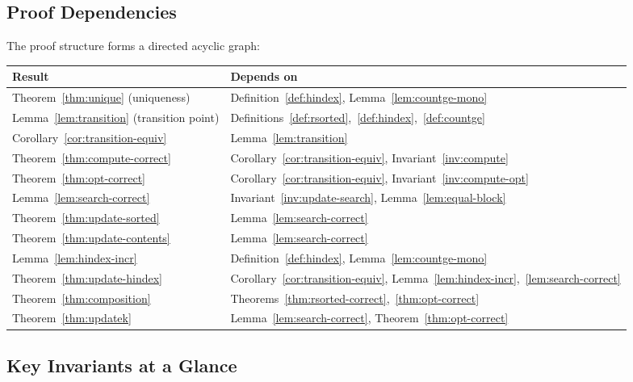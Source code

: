 \subsection{Proof Dependencies}

The proof structure forms a directed acyclic graph:

\begin{center}
\begin{tabular}{@{}ll@{}}
\toprule
\textbf{Result} & \textbf{Depends on} \\
\midrule
Theorem~\ref{thm:unique} (uniqueness) & Definition~\ref{def:hindex}, Lemma~\ref{lem:countge-mono} \\
Lemma~\ref{lem:transition} (transition point) & Definitions~\ref{def:rsorted},~\ref{def:hindex},~\ref{def:countge} \\
Corollary~\ref{cor:transition-equiv} & Lemma~\ref{lem:transition} \\
Theorem~\ref{thm:compute-correct} & Corollary~\ref{cor:transition-equiv}, Invariant~\ref{inv:compute} \\
Theorem~\ref{thm:opt-correct} & Corollary~\ref{cor:transition-equiv}, Invariant~\ref{inv:compute-opt} \\
Lemma~\ref{lem:search-correct} & Invariant~\ref{inv:update-search}, Lemma~\ref{lem:equal-block} \\
Theorem~\ref{thm:update-sorted} & Lemma~\ref{lem:search-correct} \\
Theorem~\ref{thm:update-contents} & Lemma~\ref{lem:search-correct} \\
Lemma~\ref{lem:hindex-incr} & Definition~\ref{def:hindex}, Lemma~\ref{lem:countge-mono} \\
Theorem~\ref{thm:update-hindex} & Corollary~\ref{cor:transition-equiv}, Lemma~\ref{lem:hindex-incr},~\ref{lem:search-correct} \\
Theorem~\ref{thm:composition} & Theorems~\ref{thm:rsorted-correct},~\ref{thm:opt-correct} \\
Theorem~\ref{thm:updatek} & Lemma~\ref{lem:search-correct}, Theorem~\ref{thm:opt-correct} \\
\bottomrule
\end{tabular}
\end{center}

\subsection{Key Invariants at a Glance}

